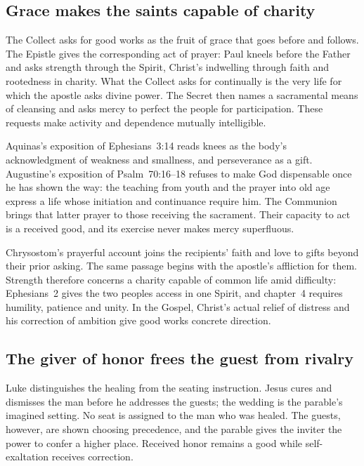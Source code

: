 \subsection*{Grace makes the saints capable of charity}
The Collect asks for good works as the fruit of grace that goes before and follows. The Epistle gives the corresponding act of prayer: Paul kneels before the Father and asks strength through the Spirit, Christ's indwelling through faith and rootedness in charity. What the Collect asks for continually is the very life for which the apostle asks divine power. The Secret then names a sacramental means of cleansing and asks mercy to perfect the people for participation. These requests make activity and dependence mutually intelligible.

Aquinas's exposition of Ephesians~3:14 reads knees as the body's acknowledgment of weakness and smallness, and perseverance as a gift. Augustine's exposition of Psalm~70:16--18 refuses to make God dispensable once he has shown the way: the teaching from youth and the prayer into old age express a life whose initiation and continuance require him. The Communion brings that latter prayer to those receiving the sacrament. Their capacity to act is a received good, and its exercise never makes mercy superfluous. 

Chrysostom's prayerful account joins the recipients' faith and love to gifts beyond their prior asking. The same passage begins with the apostle's affliction for them. Strength therefore concerns a charity capable of common life amid difficulty: Ephesians~2 gives the two peoples access in one Spirit, and chapter~4 requires humility, patience and unity. In the Gospel, Christ's actual relief of distress and his correction of ambition give good works concrete direction. 

\subsection*{The giver of honor frees the guest from rivalry}
Luke distinguishes the healing from the seating instruction. Jesus cures and dismisses the man before he addresses the guests; the wedding is the parable's imagined setting. No seat is assigned to the man who was healed. The guests, however, are shown choosing precedence, and the parable gives the inviter the power to confer a higher place. Received honor remains a good while self-exaltation receives correction.

